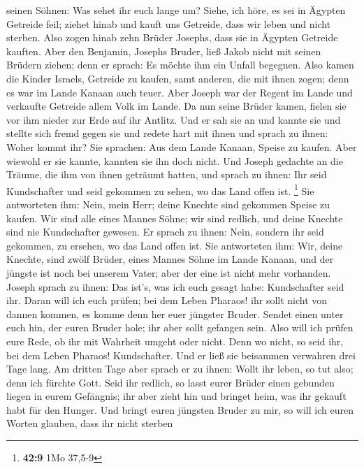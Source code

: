 seinen Söhnen: Was sehet ihr euch lange um?  Siehe, ich
höre, es sei in Ägypten Getreide feil; ziehet hinab und kauft uns
Getreide, dass wir leben und nicht sterben.  Also zogen
hinab zehn Brüder Josephs, dass sie in Ägypten Getreide kauften.
 Aber den Benjamin, Josephs Bruder, ließ Jakob nicht mit
seinen Brüdern ziehen; denn er sprach: Es möchte ihm ein Unfall
begegnen.  Also kamen die Kinder Israels, Getreide zu
kaufen, samt anderen, die mit ihnen zogen; denn es war im Lande Kanaan
auch teuer.  Aber Joseph war der Regent im Lande und
verkaufte Getreide allem Volk im Lande. Da nun seine Brüder kamen,
fielen sie vor ihm nieder zur Erde auf ihr Antlitz.  Und er
sah sie an und kannte sie und stellte sich fremd gegen sie und redete
hart mit ihnen und sprach zu ihnen: Woher kommt ihr? Sie sprachen: Aus
dem Lande Kanaan, Speise zu kaufen.  Aber wiewohl er sie
kannte, kannten sie ihn doch nicht.  Und Joseph gedachte an
die Träume, die ihm von ihnen geträumt hatten, und sprach zu ihnen: Ihr
seid Kundschafter und seid gekommen zu sehen, wo das Land offen ist.
\footnote{\textbf{42:9} 1Mo 37,5-9}  Sie antworteten ihm:
Nein, mein Herr; deine Knechte sind gekommen Speise zu kaufen.
 Wir sind alle eines Mannes Söhne; wir sind redlich, und
deine Knechte sind nie Kundschafter gewesen.  Er sprach zu
ihnen: Nein, sondern ihr seid gekommen, zu ersehen, wo das Land offen
ist.  Sie antworteten ihm: Wir, deine Knechte, sind zwölf
Brüder, eines Mannes Söhne im Lande Kanaan, und der jüngste ist noch bei
unserem Vater; aber der eine ist nicht mehr vorhanden. 
Joseph sprach zu ihnen: Das ist's, was ich euch gesagt habe:
Kundschafter seid ihr.  Daran will ich euch prüfen; bei dem
Leben Pharaos! ihr sollt nicht von dannen kommen, es komme denn her euer
jüngster Bruder.  Sendet einen unter euch hin, der euren
Bruder hole; ihr aber sollt gefangen sein. Also will ich prüfen eure
Rede, ob ihr mit Wahrheit umgeht oder nicht. Denn wo nicht, so seid ihr,
bei dem Leben Pharaos! Kundschafter.  Und er ließ sie
beisammen verwahren drei Tage lang.  Am dritten Tage aber
sprach er zu ihnen: Wollt ihr leben, so tut also; denn ich fürchte Gott.
 Seid ihr redlich, so lasst eurer Brüder einen gebunden
liegen in eurem Gefängnis; ihr aber zieht hin und bringet heim, was ihr
gekauft habt für den Hunger.  Und bringt euren jüngsten
Bruder zu mir, so will ich euren Worten glauben, dass ihr nicht sterben
